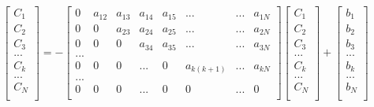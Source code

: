 \documentclass[a1paper]{article}
\begin{document}
\begin{equation}
    \begin{bmatrix}
        C_1 \\ C_2 \\ C_3 \\ ... \\ C_k \\ ... \\ C_N \\
    \end{bmatrix}
    = -
    \begin{bmatrix}
        0 & a_{12} & a_{13} &  a_{14} &  a_{15} & ...         & ... & a_{1N} \\
        0 &      0 & a_{23} &  a_{24} &  a_{25} & ...         & ... & a_{2N} \\
        0 &      0 &      0 &  a_{34} &  a_{35} & ...         & ... & a_{3N} \\
        ... \\
        0 &      0 &      0 & ...     &       0 & a_{k(k+1)}  & ... & a_{kN} \\
        ... \\
        0 &      0 &      0 & ...     &       0 &          0  & ... & 0 \\
    \end{bmatrix}
    \begin{bmatrix}
        C_1 \\ C_2 \\ C_3 \\ ... \\ C_k \\ ... \\ C_N \\
    \end{bmatrix}
    +
    \begin{bmatrix}
        b_1 \\ b_2 \\ b_3 \\ ... \\ b_k \\ ... \\ b_N \\
    \end{bmatrix}
\end{equation}
\end{document}
